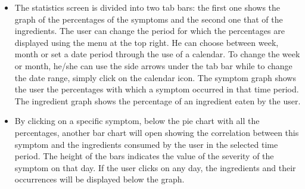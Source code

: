 \documentclass [12pt]{article}
\begin{document}
\begin{description}[leftmargin=1cm,rightmargin=1cm]
\begin{figure}[h!]
\hspace*{\fill}
\end{figure}
\begin{itemize}[•]
\item The statistics screen is divided into two tab bars: the first one shows the graph of the percentages of the symptoms and the second one that of the ingredients. The user can change the period for which the percentages are displayed using the menu at the top right. He can choose between week, month or set a date period through the use of a calendar. To change the week or month, he/she can use the side arrows under the tab bar while to change the date range, simply click on the calendar icon.
The symptom graph shows the user the percentages with which a symptom occurred in that time period. The ingredient graph shows the percentage of an ingredient eaten by the user.
\item By clicking on a specific symptom, below the pie chart with all the percentages, another bar chart will open showing the correlation between this symptom and the ingredients consumed by the user in the selected time period. The height of the bars indicates the value of the severity of the symptom on that day. If the user clicks on any day, the ingredients and their occurrences will be displayed below the graph.
\end{itemize}


\end{description}
\end{document}
